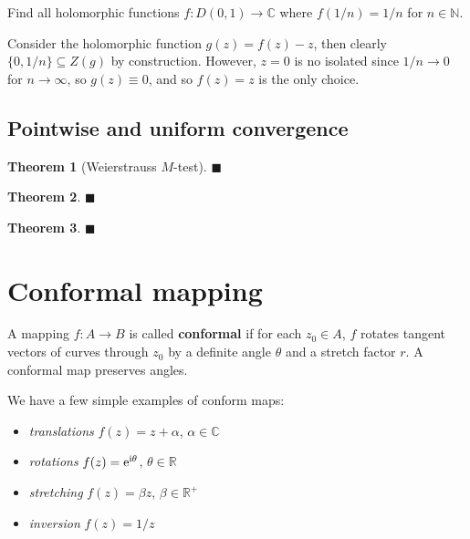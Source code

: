 \documentclass[letter-paper]{tufte-book}
\newtheorem{theorem}{\color{pastel-blue}Theorem}[section]
\newenvironment{example}[1][Example]{\begin{trivlist}
\item[\hskip \labelsep {\bfseries #1}]}{\end{trivlist}}
\newcommand{\ex}{\mathrm{e}}
\newcommand{\zi}{{\rm i}}
\newcommand{\qed}{\hfill$\blacksquare$}
\begin{document}
\begin{example}
  Find all holomorphic functions $f:D(0, 1) \to \mathbb{C}$ where $f(1/n) = 1/n$
  for $n\in\mathbb{N}$.
  
  Consider the holomorphic function $g(z) = f(z) - z$, then clearly $\{0, 1/n\}
  \subseteq Z(g)$ by construction. However, $z=0$ is no isolated since $1/n\to
  0$ for $n\to \infty$, so $g(z) \equiv 0$, and so $f(z) = z$ is the only
  choice.
\end{example}


\section{Pointwise and uniform convergence}

\begin{theorem}[Weierstrauss $M$-test]

\qed

\end{theorem}

\begin{theorem}

\qed

\end{theorem}

\begin{theorem}

\qed

\end{theorem}


\chapter{Conformal mapping}

A mapping $f: A \to B$ is called \textbf{conformal} if for each $z_0 \in A$, $f$
rotates tangent vectors of curves through $z_0$ by a definite angle $\theta$ and
a stretch factor $r$. A conformal map preserves angles.

\begin{example}
  We have a few simple examples of conform maps:
  \begin{itemize}
    \item \emph{translations} $f(z) = z+\alpha$, $\alpha \in \mathbb{C}$
    \item \emph{rotations} $f(z) = \ex^{\zi \theta}$, $\theta \in \mathbb{R}$
    \item \emph{stretching} $f(z) = \beta z$, $\beta \in \mathbb{R}^+$
    \item \emph{inversion} $f(z) = 1/z$
  \end{itemize}
\end{example}
\end{document}
